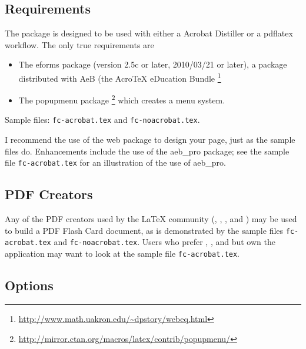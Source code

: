 \documentclass{article}
\newcommand{\prodName}{\textsf{PDF Flash Card}}
\begin{document}
\subsection{Requirements}

The package is designed to be used with either a \textsf{Acrobat Distiller}
or a \textsf{pdflatex} workflow. The only true requirements are
\begin{itemize}
\item The \textsf{eforms} package (version 2.5c or later, 2010/03/21 or
later), a package distributed with AeB (the {Acro\!\TeX} eDucation Bundle%
\footnote{\url{http://www.math.uakron.edu/~dpstory/webeq.html}}

\item The \textsf{popupmenu} package
    \footnote{\url{http://mirror.ctan.org/macros/latex/contrib/popupmenu/}}
    which creates a menu system.

\end{itemize}

\redpoint Sample files: \texttt{fc-acrobat.tex} and \texttt{fc-noacrobat.tex}.

\newtopic\noindent I recommend the use of the \textsf{web} package to design your
page, just as the sample files do. Enhancements include the use of the
\textsf{aeb\_pro} package; see the sample file \texttt{fc-acrobat.tex} for an
illustration of the use of \textsf{aeb\_pro}.

\subsection{PDF Creators}

Any of the PDF creators used by the {\LaTeX} community
(, , , and )
may be used to build a {\prodName} document, as is demonstrated by the sample files
\texttt{fc-acrobat.tex} and \texttt{fc-noacrobat.tex}. Users who prefer
, , and  but own the 
application may want to look at the sample file \texttt{fc-acrobat.tex}.

\subsection{Options}
\end{document}
